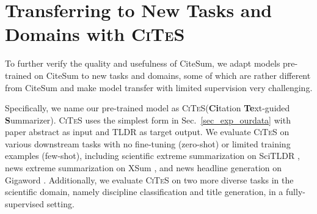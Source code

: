 \documentclass[11pt]{article}
\newcommand{\upv}{\vspace{-.0cm}}
\newcommand{\downv}{\vspace{-.1cm}}
\newcommand{\ours}{\textsc{CiTeS}\xspace}
\newcommand{\ourdata}{CiteSum\xspace}
\begin{document}
\begin{table}[t]
\centering
{}
\upv
\caption{Performance of different methods on \ourdata. BART-large is used as the base model if not otherwise specified. ``/'' indicates multi-task learning.  R stands for ROUGE \cite{lin-2004-rouge} in all the tables.}
\downv
\label{table_res_ourdata}
\end{table}




\section{Transferring to New Tasks and Domains with \ours}
\label{sec_exp_transfer}
To further verify the quality and usefulness of \ourdata, we adapt models pre-trained on \ourdata to new tasks and domains, some of which are rather different from \ourdata and make model transfer with limited supervision very challenging.

Specifically, we name our pre-trained model as \ours (\textbf{Ci}tation \textbf{Te}xt-guided \textbf{S}ummarizer).
\ours uses the simplest form in Sec.~\ref{sec_exp_ourdata} with paper abstract as input and TLDR as target output.
We evaluate  \ours on various downstream tasks with no fine-tuning (zero-shot) or limited training examples (few-shot), including scientific extreme summarization on SciTLDR \cite{cachola-etal-2020-tldr}, news extreme summarization on XSum \cite{narayan-etal-2018-dont}, and news headline generation on Gigaword \cite{rush-etal-2015-neural}.
Additionally, we evaluate \ours on two more diverse tasks in the scientific domain,  namely discipline classification and title generation, in a fully-supervised setting.
\end{document}
